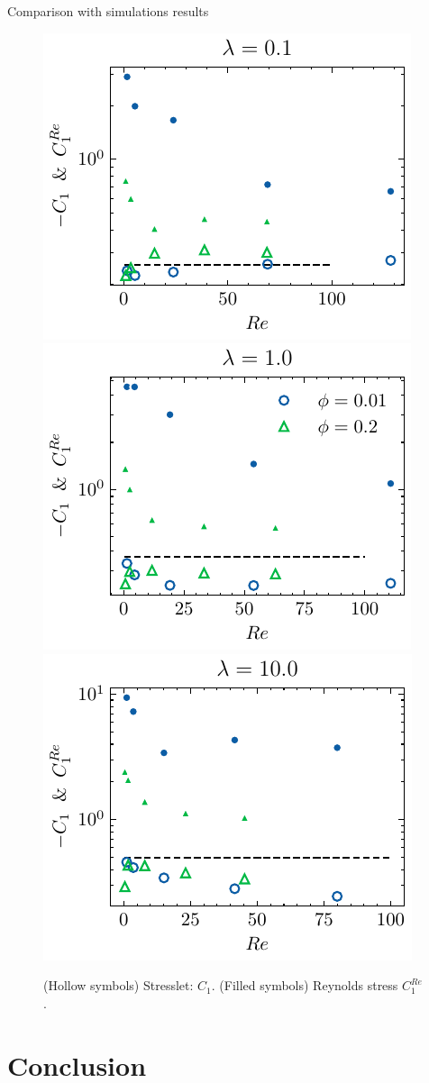 \documentclass{sintefbeamer}
\begin{document}
\begin{frame}{Comparison with simulations results}
  \begin{figure}[h!]
    \centering
    \includegraphics[height = 0.25\textwidth]{image/HOMOGENEOUS_final/PA/Sdev_diapo_l_1.pdf}
    \includegraphics[height = 0.25\textwidth]{image/HOMOGENEOUS_final/PA/Sdev_diapo_l_10.pdf}
    \includegraphics[height = 0.25\textwidth]{image/HOMOGENEOUS_final/PA/Sdev_diapo_l_100.pdf}
    \caption{
      (Hollow symbols) Stresslet: $C_1$. 
      (Filled symbols) Reynolds stress $C_1^{Re}$. 
     }
\end{figure}



\end{frame}



\section{Conclusion}
\section*{}
\end{document}
